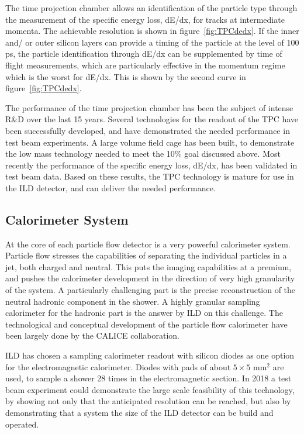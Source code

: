 \documentclass[%
 amsmath,amssymb,
 aps,
]{revtex4-1}
\begin{document}
The time projection chamber allows an identification of the particle type through the measurement of the specific energy loss, dE/dx, for tracks at intermediate momenta. The achievable resolution is shown in figure~\ref{fig:TPCdedx}. If the inner and/ or outer silicon layers can provide a timing of the particle at the level of 100 ps, the particle identification through dE/dx can be supplemented by time of flight measurements, which are particularly effective in the momentum regime which is the worst for dE/dx. This is shown by the second curve in figure~\ref{fig:TPCdedx}. 

The performance of the time projection chamber has been the subject of intense R\&D over the last 15 years. Several technologies for the readout of the TPC have been successfully developed, and have demonstrated the needed performance in test beam experiments. A large volume field cage has been built, to demonstrate the low mass technology needed to meet the 10\% goal discussed above. Most recently the performance of the specific energy loss, dE/dx, has been validated in test beam data. Based on these results, the TPC technology is mature for use in the ILD detector, and can deliver the needed performance. 


\subsection{Calorimeter System}
At the core of each particle flow detector is a very powerful calorimeter system. Particle flow stresses the capabilities of separating the individual particles in a jet, both charged and neutral. This puts the imaging capabilities at a premium, and pushes the calorimeter development in the direction of very high granularity of the system. A particularly challenging part is the precise reconstruction of the neutral hadronic component in the shower. A highly granular sampling calorimeter for the hadronic part is the answer by ILD on this challenge. The technological and conceptual development of the particle flow calorimeter have been largely done by the CALICE collaboration. 

ILD has chosen a sampling calorimeter readout with silicon diodes as one option for the electromagnetic calorimeter. Diodes with pads of about $5 \times 5$ mm$^2$ are used, to sample a shower 28 times in the electromagnetic section. In 2018 a test beam experiment could demonstrate the large scale feasibility of this technology, by showing not only that the anticipated resolution can be reached, but also by demonstrating that a system the size of the ILD detector can be build and operated. 
\end{document}
